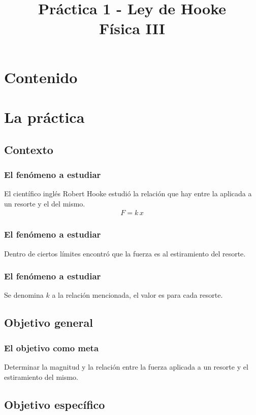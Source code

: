 \documentclass[14pt]{beamer}
\title{\Large{Práctica 1 - Ley de Hooke} \\ \normalsize{Física III}}
\date{}
\begin{document}
\maketitle

\section*{Contenido}

\section{La práctica}
\subsection{Contexto}

\begin{frame}
\frametitle{El fenómeno a estudiar}
El científico inglés Robert Hooke estudió la relación que hay entre la  aplicada a un resorte \pause y el  del mismo.
\pause
\begin{align*}
F = k \, x
\end{align*}
\end{frame}
\begin{frame}
\frametitle{El fenómeno a estudiar}
Dentro de ciertos límites encontró que la fuerza es  al estiramiento del resorte.
\end{frame}
\begin{frame}
\frametitle{El fenómeno a estudiar}
Se denomina $k$ a la relación mencionada, \pause el valor es  para cada resorte.
\end{frame}

\subsection{Objetivo general}

\begin{frame}
\frametitle{El objetivo como meta}
Determinar la magnitud y la relación entre la fuerza aplicada a un resorte y el estiramiento del mismo.
\end{frame}

\subsection{Objetivo específico}
\end{document}
